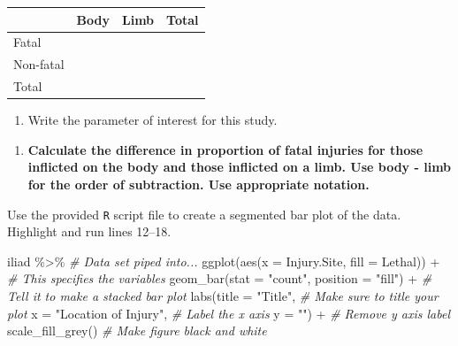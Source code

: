 \documentclass[
]{report}
\newenvironment{Shaded}{\begin{snugshade}}{\end{snugshade}}
\newcommand{\AttributeTok}[1]{\textcolor[rgb]{0.77,0.63,0.00}{#1}}
\newcommand{\CommentTok}[1]{\textcolor[rgb]{0.56,0.35,0.01}{\textit{#1}}}
\newcommand{\FunctionTok}[1]{\textcolor[rgb]{0.00,0.00,0.00}{#1}}
\newcommand{\NormalTok}[1]{#1}
\newcommand{\SpecialCharTok}[1]{\textcolor[rgb]{0.00,0.00,0.00}{#1}}
\newcommand{\StringTok}[1]{\textcolor[rgb]{0.31,0.60,0.02}{#1}}
\providecommand{\tightlist}{%
  \setlength{\itemsep}{0pt}\setlength{\parskip}{0pt}}
\begin{document}
\begin{longtable}[]{@{}llll@{}}
\toprule
& Body & Limb & Total \\
\midrule
\endhead
Fatal & & & \\
Non-fatal & & & \\
Total & & & \\
\bottomrule
\end{longtable}

\begin{enumerate}
\def\labelenumi{\arabic{enumi}.}
\setcounter{enumi}{4}
\tightlist
\item
  Write the parameter of interest for this study.
\end{enumerate}

\vspace{1in}

\begin{enumerate}
\def\labelenumi{\arabic{enumi}.}
\setcounter{enumi}{5}
\tightlist
\item
  \textbf{Calculate the difference in proportion of fatal injuries for those inflicted on the body and those inflicted on a limb. Use body - limb for the order of subtraction. Use appropriate notation.}
\end{enumerate}

\vspace{0.8in}

Use the provided \texttt{R} script file to create a segmented bar plot of the data. Highlight and run lines 12--18.

\begin{Shaded}
\begin{Highlighting}[]
\NormalTok{iliad }\SpecialCharTok{\%\textgreater{}\%} \CommentTok{\# Data set piped into...}
\FunctionTok{ggplot}\NormalTok{(}\FunctionTok{aes}\NormalTok{(}\AttributeTok{x =}\NormalTok{ Injury.Site, }\AttributeTok{fill =}\NormalTok{ Lethal)) }\SpecialCharTok{+}   \CommentTok{\# This specifies the variables}
  \FunctionTok{geom\_bar}\NormalTok{(}\AttributeTok{stat =} \StringTok{"count"}\NormalTok{, }\AttributeTok{position =} \StringTok{"fill"}\NormalTok{) }\SpecialCharTok{+}  \CommentTok{\# Tell it to make a stacked bar plot}
  \FunctionTok{labs}\NormalTok{(}\AttributeTok{title =} \StringTok{"Title"}\NormalTok{,  }\CommentTok{\# Make sure to title your plot }
       \AttributeTok{x =} \StringTok{"Location of Injury"}\NormalTok{,   }\CommentTok{\# Label the x axis}
       \AttributeTok{y =} \StringTok{""}\NormalTok{) }\SpecialCharTok{+}  \CommentTok{\# Remove y axis label}
    \FunctionTok{scale\_fill\_grey}\NormalTok{()  }\CommentTok{\# Make figure black and white}
\end{Highlighting}
\end{Shaded}
\end{document}
